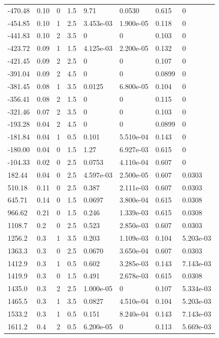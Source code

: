 \documentclass[preview]{standalone}
\begin{document}
{{\begin{tabular}{L{1.2cm}C{1.2cm} C{0.3cm}C{0.5cm} C{1.4cm}C{1.4cm} C{1.4cm}C{1.4cm}}
  -470.48  &  0.10  & 0     & 1.5 &  9.71  & 0.0530  & 0.615 &  0   \\ 
  -454.85  &  0.10  & 1     & 2.5 &  3.453e-03  & 1.900e-05  & 0.118 &  0   \\ 
  -441.83  &  0.10  & 2     & 3.5 &  0  & 0  & 0.103 &  0   \\ 
  -423.72  &  0.09  & 1     & 1.5 &  4.125e-03  & 2.200e-05  & 0.132 &  0   \\ 
  -421.45  &  0.09  & 2     & 2.5 &  0  & 0  & 0.107 &  0   \\ 
  -391.04  &  0.09  & 2     & 4.5 &  0  & 0  & 0.0899 &  0   \\ 
  -381.45  &  0.08  & 1     & 3.5 &  0.0125  & 6.800e-05  & 0.104 &  0   \\ 
  -356.41  &  0.08  & 2     & 1.5 &  0  & 0  & 0.115 &  0   \\ 
  -321.46  &  0.07  & 2     & 3.5 &  0  & 0  & 0.103 &  0   \\ 
  -193.28  &  0.04  & 2     & 4.5 &  0  & 0  & 0.0899 &  0   \\ 
  -181.84  &  0.04  & 1     & 0.5 &  0.101  & 5.510e-04  & 0.143 &  0   \\ 
  -180.00  &  0.04  & 0     & 1.5 &  1.27  & 6.927e-03  & 0.615 &  0   \\ 
  -104.33  &  0.02  & 0     & 2.5 &  0.0753  & 4.110e-04  & 0.607 &  0   \\ 
  182.44  &  0.04  & 0     & 2.5 &  4.597e-03  & 2.500e-05  & 0.607 &  0.0303   \\ 
  510.18  &  0.11  & 0     & 2.5 &  0.387  & 2.111e-03  & 0.607 &  0.0303   \\ 
  645.71  &  0.14  & 0     & 1.5 &  0.0697  & 3.800e-04  & 0.615 &  0.0308   \\ 
  966.62  &  0.21  & 0     & 1.5 &  0.246  & 1.339e-03  & 0.615 &  0.0308   \\ 
  1108.7  &   0.2  & 0     & 2.5 &  0.523  & 2.850e-03  & 0.607 &  0.0303   \\ 
  1256.2  &   0.3  & 1     & 3.5 &  0.203  & 1.109e-03  & 0.104 &  5.203e-03   \\ 
  1363.3  &   0.3  & 0     & 2.5 &  0.0670  & 3.650e-04  & 0.607 &  0.0303   \\ 
  1412.9  &   0.3  & 1     & 0.5 &  0.602  & 3.285e-03  & 0.143 &  7.143e-03   \\ 
  1419.9  &   0.3  & 0     & 1.5 &  0.491  & 2.678e-03  & 0.615 &  0.0308   \\ 
  1435.0  &   0.3  & 2     & 2.5 &  1.000e-05  & 0  & 0.107 &  5.334e-03   \\ 
  1465.5  &   0.3  & 1     & 3.5 &  0.0827  & 4.510e-04  & 0.104 &  5.203e-03   \\ 
  1533.2  &   0.3  & 1     & 0.5 &  0.151  & 8.240e-04  & 0.143 &  7.143e-03   \\ 
  1611.2  &   0.4  & 2     & 0.5 &  6.200e-05  & 0  & 0.113 &  5.669e-03   \\ 
\hline 
\end{tabular} 

}}
\end{document}
